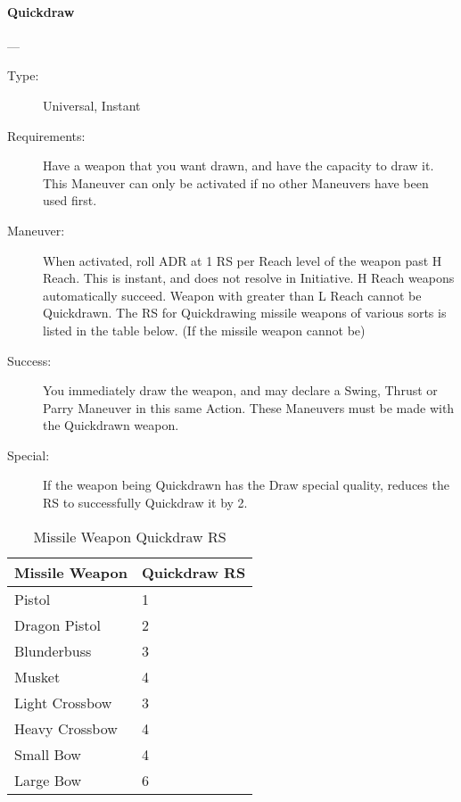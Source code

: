 \documentclass[oneside,11pt,english]{book}
\begin{document}
\paragraph{\large\label{man:Quickdraw}Quickdraw}---\quad{\large[1]}
\vspace{-10pt}\begin{description} 
\item [Type:] Universal, Instant 
\item [Requirements:] Have a weapon that you want drawn, and have the capacity to draw it. This Maneuver can only be activated if no other Maneuvers have been used first.
\item [Maneuver:] When activated, roll ADR at 1 RS per Reach level of the weapon past H Reach. This is instant, and does not resolve in Initiative. H Reach weapons automatically succeed. Weapon with greater than L Reach cannot be Quickdrawn.
The RS for Quickdrawing missile weapons of various sorts is listed in the table below. (If the missile weapon cannot be)
\item [Success:] You immediately draw the weapon, and may declare a Swing, Thrust or Parry Maneuver in this same Action. These Maneuvers must be made with the Quickdrawn weapon. 
\item [Special:] If the weapon being Quickdrawn has the Draw special quality, reduces the RS to successfully Quickdraw it by 2. 
\end{description}
\begin{table}[!ht]
	\centering
	\caption{Missile Weapon Quickdraw RS}
	\label{tab:Quickdraw RS Missile Weapons}
	\begin{tabu} spread 0pt{XX}
Missile Weapon &Quickdraw RS \\\toprule
Pistol &1 \\
Dragon Pistol& 2 \\
Blunderbuss &3 \\
Musket &4 \\
Light Crossbow &3 \\
Heavy Crossbow &4 \\
Small Bow &4 \\
Large Bow &6 \\
\end{tabu}
\end{table}
\end{document}
